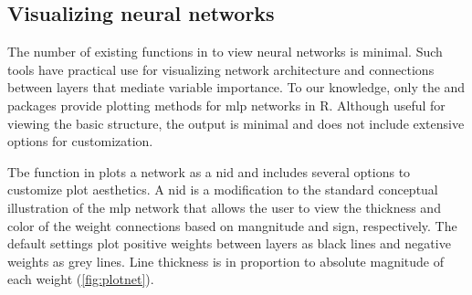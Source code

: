 \documentclass[article,shortnames]{jss}\usepackage[]{graphicx}\usepackage[]{color}
\begin{document}
\subsection{Visualizing neural networks}

The number of existing functions in  to view neural networks is minimal.  Such tools have practical use for visualizing network architecture and connections between layers that mediate variable importance. To our knowledge, only the  and  packages provide plotting methods for \ac{mlp} networks in R.  Although useful for viewing the basic structure, the output is minimal and does not include extensive options for customization.

Tbe  function in  plots a network as a \acl{nid} \citep{Ozesmi99} and includes several options to customize plot aesthetics. A \ac{nid} is a modification to the standard conceptual illustration of the \ac{mlp} network that allows the user to view the thickness and color of the weight connections based on mangnitude and sign, respectively.  The default settings plot positive weights between layers as black lines and negative weights as grey lines. Line thickness is in proportion to absolute magnitude of each weight (\cref{fig:plotnet}).
\end{document}
